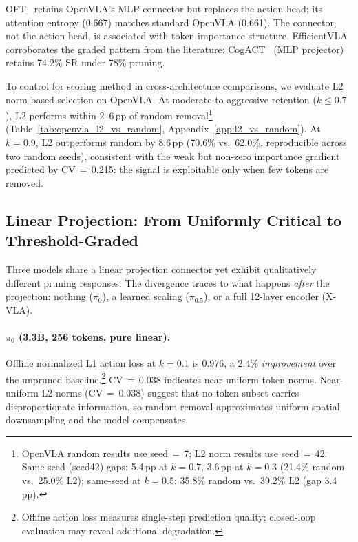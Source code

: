 OFT~\cite{kim2025openoft} retains OpenVLA's MLP connector but replaces the action head; its attention entropy (0.667) matches standard OpenVLA (0.661). The connector, not the action head, is associated with token importance structure. EfficientVLA~\cite{yang2025efficientvla} corroborates the graded pattern from the literature: CogACT~\cite{li2024cogact} (MLP projector) retains 74.2\% SR under 78\% pruning.

To control for scoring method in cross-architecture comparisons, we evaluate L2 norm-based selection on OpenVLA. At moderate-to-aggressive retention ($k \leq 0.7$), L2 performs within 2--6\,pp of random removal\footnote{OpenVLA random results use seed$\,{=}\,$7; L2 norm results use seed$\,{=}\,$42. Same-seed (seed42) gaps: 5.4\,pp at $k{=}0.7$, 3.6\,pp at $k{=}0.3$ (21.4\% random vs.\ 25.0\% L2); same-seed at $k{=}0.5$: 35.8\% random vs.\ 39.2\% L2 (gap 3.4\,pp).} (Table~\ref{tab:openvla_l2_vs_random}, Appendix~\ref{app:l2_vs_random}). At $k{=}0.9$, L2 outperforms random by 8.6\,pp (70.6\% vs.\ 62.0\%, reproducible across two random seeds), consistent with the weak but non-zero importance gradient predicted by CV$\,{=}\,$0.215: the signal is exploitable only when few tokens are removed.

\subsection{Linear Projection: From Uniformly Critical to Threshold-Graded}
\label{sec:linear_results}

Three models share a linear projection connector yet exhibit qualitatively different pruning responses. The divergence traces to what happens \emph{after} the projection: nothing ($\pi_0$), a learned scaling ($\pi_0.5$), or a full 12-layer encoder (X-VLA).

\paragraph{$\pi_0$ (3.3B, 256 tokens, pure linear).} Offline normalized L1 action loss at $k{=}0.1$ is 0.976, a 2.4\% \emph{improvement} over the unpruned baseline.\footnote{Offline action loss measures single-step prediction quality; closed-loop evaluation may reveal additional degradation.} CV$\,{=}\,$0.038 indicates near-uniform token norms. Near-uniform L2 norms (CV$\,{=}\,$0.038) suggest that no token subset carries disproportionate information, so random removal approximates uniform spatial downsampling and the model compensates.

